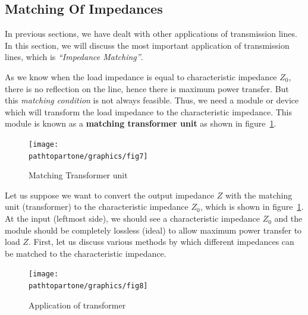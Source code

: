 \subsection{Matching Of Impedances}\label{lec:lec12}
In previous sections, we have dealt with other applications of transmission lines. In this section, we will discuss the most important application of transmission lines, which is \emph{\textquotedblleft Impedance Matching\textquotedblright}.

As we know when the load impedance is equal to characteristic impedance $Z_0$, there is no reflection on the line, hence there is maximum power transfer. But this \textit{matching condition} is not always feasible. Thus, we need a module or device which will transform the load impedance to the characteristic impedance. This module is known as a \textbf{matching transformer unit} as shown in figure~\ref{fig:fig7}.
\begin{figure}[h]
\centering
\texttt{[image: \\pathtopartone/graphics/fig7]}
\caption{Matching Transformer unit}
\label{fig:fig7}
\end{figure} 

Let us suppose we want to convert the output impedance $Z$ with the matching unit (transformer) to the characteristic impedance $Z_0$, which is shown in figure~\ref{fig:fig7}. At the input (leftmost side), we should see a characteristic impedance $ Z_0$ and the module should be completely lossless (ideal) to allow maximum power transfer to load $Z$. First, let us discuss various methods by which different impedances can be matched to the characteristic impedance.
\begin{figure}[h]
\centering
\texttt{[image: \\pathtopartone/graphics/fig8]}
\caption{Application of transformer}
\label{fig:fig8}
\end{figure}

